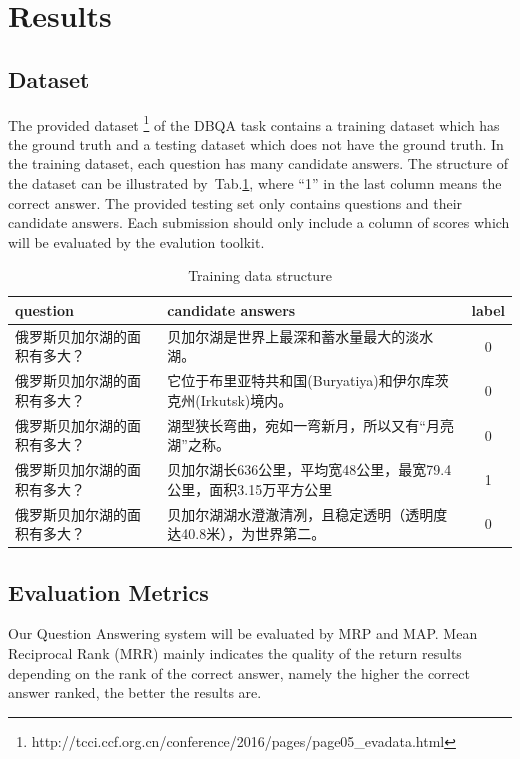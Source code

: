 \documentclass{llncs}
\begin{document}
\section{Results}
\label{sec:results}

\subsection{Dataset}

The provided dataset \footnote{ http://tcci.ccf.org.cn/conference/2016/pages/page05\_evadata.html} of the DBQA task contains a training dataset which has the ground truth and a testing dataset which does not have the ground truth. In the training dataset, each question has many candidate answers. The structure of the dataset can be illustrated by~Tab.\ref{tab:table1}, where ``1'' in the last column means the correct answer. The provided testing set only contains questions and their candidate answers. Each submission should only include a column of scores which will be evaluated by the evalution toolkit.  


\begin{table}[!htbp]
\caption{Training data structure}
\scriptsize
\label{tab:table1}
\begin{tabular}{|l|l|c|}
 \hline
question & candidate answers & label \\ \hline
俄罗斯贝加尔湖的面积有多大？& 贝加尔湖是世界上最深和蓄水量最大的淡水湖。& 0 \\
\hline
俄罗斯贝加尔湖的面积有多大？& 它位于布里亚特共和国(Buryatiya)和伊尔库茨克州(Irkutsk)境内。&0\\
\hline
俄罗斯贝加尔湖的面积有多大？& 湖型狭长弯曲，宛如一弯新月，所以又有“月亮湖”之称。&0\\
\hline
俄罗斯贝加尔湖的面积有多大？& 贝加尔湖长636公里，平均宽48公里，最宽79.4公里，面积3.15万平方公里& 1\\
\hline
俄罗斯贝加尔湖的面积有多大？& 贝加尔湖湖水澄澈清冽，且稳定透明（透明度达40.8米），为世界第二。&0\\
\hline
\end{tabular}

\end{table}

\subsection{Evaluation Metrics}
Our Question Answering system will be evaluated by MRP and MAP. Mean Reciprocal Rank (MRR) mainly indicates the quality of the return results depending on the rank of the correct answer, namely the higher the correct answer ranked, the better the results are.
\end{document}
